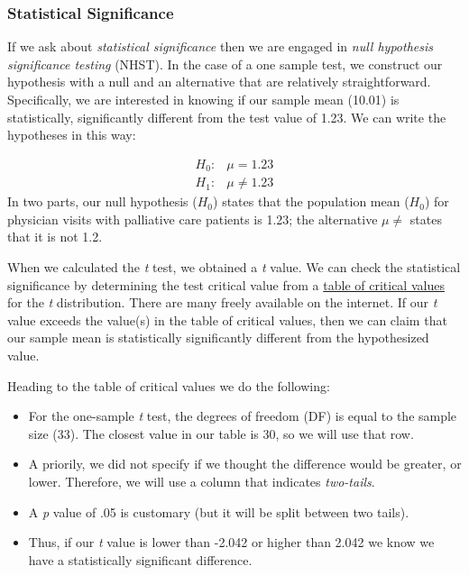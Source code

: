 \documentclass[
  11pt,
]{book}
\providecommand{\tightlist}{%
  \setlength{\itemsep}{0pt}\setlength{\parskip}{0pt}}
\begin{document}
\hypertarget{statistical-significance}{%
\subsubsection{Statistical Significance}\label{statistical-significance}}

If we ask about \emph{statistical significance} then we are engaged in \emph{null hypothesis significance testing} (NHST). In the case of a one sample test, we construct our hypothesis with a null and an alternative that are relatively straightforward. Specifically, we are interested in knowing if our sample mean (10.01) is statistically, significantly different from the test value of 1.23. We can write the hypotheses in this way:

\[
\begin{array}{ll}
H_0: & \mu = 1.23 \\
H_1: & \mu \neq 1.23
\end{array}
\]
In two parts, our null hypothesis (\(H_0\)) states that the population mean (\(H_0\)) for physician visits with palliative care patients is 1.23; the alternative \(\mu \neq\) states that it is not 1.2.

When we calculated the \emph{t} test, we obtained a \emph{t} value. We can check the statistical significance by determining the test critical value from a \href{https://www.statology.org/t-distribution-table/}{table of critical values} for the \emph{t} distribution. There are many freely available on the internet. If our \emph{t} value exceeds the value(s) in the table of critical values, then we can claim that our sample mean is statistically significantly different from the hypothesized value.

Heading to the table of critical values we do the following:

\begin{itemize}
\tightlist
\item
  For the one-sample \emph{t} test, the degrees of freedom (DF) is equal to the sample size (33). The closest value in our table is 30, so we will use that row.
\item
  A priorily, we did not specify if we thought the difference would be greater, or lower. Therefore, we will use a column that indicates \emph{two-tails}.
\item
  A \emph{p} value of .05 is customary (but it will be split between two tails).
\item
  Thus, if our \emph{t} value is lower than -2.042 or higher than 2.042 we know we have a statistically significant difference.
\end{itemize}
\end{document}
